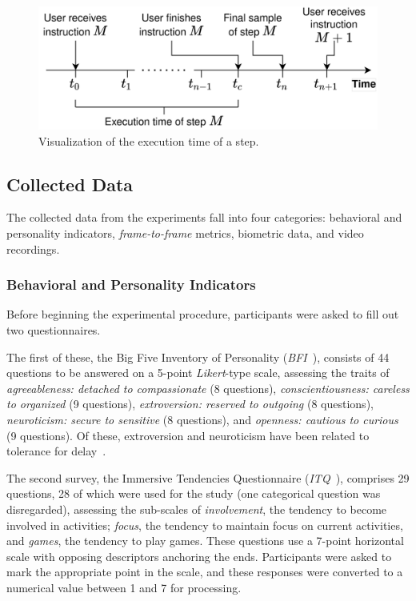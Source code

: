 \documentclass[10pt,letterpaper]{article}
\begin{document}
\begin{definition}
  \begin{figure}
    \centering
    \includegraphics[width=.85\textwidth]{images/exec_time_diagram.pdf}
    \caption{Visualization of the execution time of a step.}%
    \label{fig:exectime:diagram}
  \end{figure}

\end{definition}

\subsection{Collected Data}

The collected data from the experiments fall into four categories: behavioral and personality indicators, \emph{frame-to-frame} metrics, biometric data, and video recordings.

\subsubsection{Behavioral and Personality Indicators}

Before beginning the experimental procedure, participants were asked to fill out two questionnaires.

The first of these, the Big Five Inventory of Personality (\emph{BFI}~\autocite{john1999:bfi}), consists of 44 questions to be answered on a 5-point \emph{Likert}-type scale, assessing the traits of \emph{agreeableness: detached to compassionate} (8 questions), \emph{conscientiousness: careless to organized} (9 questions), \emph{extroversion: reserved to outgoing} (8 questions), \emph{neuroticism: secure to sensitive} (8 questions), and \emph{openness: cautious to curious} (9 questions).
Of these, extroversion and neuroticism have been related to tolerance for delay~\autocite{hirsh2008delay}. 

The second survey, the Immersive Tendencies Questionnaire (\emph{ITQ}~\autocite{witmer1998:itq}), comprises 29 questions, 28 of which were used for the study (one categorical question was disregarded), assessing the sub-scales of \emph{involvement}, the tendency to become involved in activities; \emph{focus}, the tendency to maintain focus on current activities, and \emph{games}, the tendency to play games.
These questions use a 7-point horizontal scale  with opposing descriptors anchoring  the ends.
Participants were asked to mark the appropriate point in the scale, and these responses were converted to a numerical value between 1 and 7 for processing. 
\end{document}
